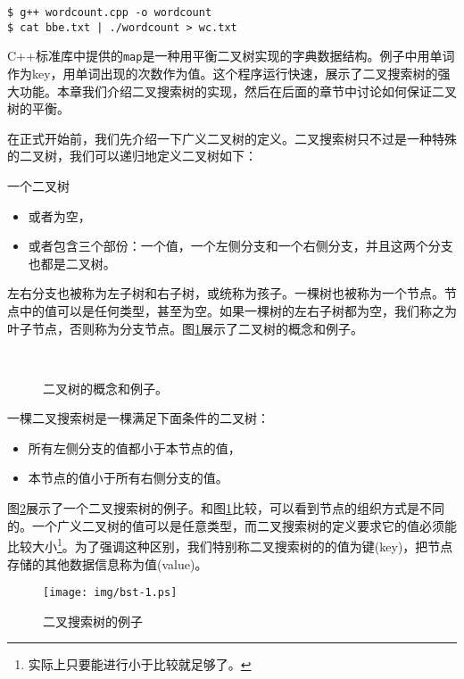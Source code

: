 \documentclass[UTF8]{article}
\begin{document}
\begin{verbatim}
$ g++ wordcount.cpp -o wordcount
$ cat bbe.txt | ./wordcount > wc.txt
\end{verbatim}

C++标准库中提供的\texttt{map}是一种用平衡二叉树实现的字典数据结构。例子中用单词作为key，用单词出现的次数作为值。这个程序运行快速，展示了二叉搜索树的强大功能。本章我们介绍二叉搜索树的实现，然后在后面的章节中讨论如何保证二叉树的平衡。

在正式开始前，我们先介绍一下广义二叉树的定义。二叉搜索树只不过是一种特殊的二叉树，我们可以递归地定义二叉树如下：

一个二叉树
\begin{itemize}
\item 或者为空，
\item 或者包含三个部份：一个值，一个左侧分支和一个右侧分支，并且这两个分支也都是二叉树。
\end{itemize}

左右分支也被称为左子树和右子树，或统称为孩子。一棵树也被称为一个节点。节点中的值可以是任何类型，甚至为空。如果一棵树的左右子树都为空，我们称之为叶子节点，否则称为分支节点。图\ref{fig:binary-tree-example}展示了二叉树的概念和例子。

\begin{figure}[htbp]
  \centering
   \\
  \caption{二叉树的概念和例子。}
  \label{fig:binary-tree-example}
\end{figure}

一棵二叉搜索树是一棵满足下面条件的二叉树：
\begin{itemize}
\item 所有左侧分支的值都小于本节点的值，
\item 本节点的值小于所有右侧分支的值。
\end{itemize}

图\ref{fig:bst-example}展示了一个二叉搜索树的例子。和图\ref{fig:binary-tree-example}比较，可以看到节点的组织方式是不同的。一个广义二叉树的值可以是任意类型，而二叉搜索树的定义要求它的值必须能比较大小\footnote{实际上只要能进行小于比较就足够了。}。为了强调这种区别，我们特别称二叉搜索树的的值为键(key)，把节点存储的其他数据信息称为值(value)。

\begin{figure}[htbp]
  \centering
  \texttt{[image: img/bst-1.ps]}
  \caption{二叉搜索树的例子} \label{fig:bst-example}
\end{figure}
\end{document}

